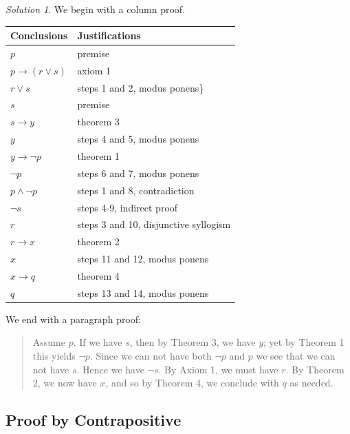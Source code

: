 \documentclass[
  letterpaper,
  10pt,
  reqno,
  twopage,
  openany]{book}
\theoremstyle{plain}
\theoremstyle{definition}
\theoremstyle{definition}
\theoremstyle{definition}
\theoremstyle{plain}
\theoremstyle{plain}
\theoremstyle{remark}
\newtheorem*{solution}{Solution}
\begin{document}
\begin{solution}

We begin with a column proof.

\begin{longtable}[]{@{}ll@{}}
\toprule()
Conclusions & Justifications \\
\midrule()
\endhead
\(p\) & premise \\
\(p\rightarrow (r\lor s)\) & axiom 1 \\
\(r\lor s\) & steps 1 and 2, modus ponens\} \\
\(s\) & premise \\
\(s\rightarrow y\) & theorem 3 \\
\(y\) & steps 4 and 5, modus ponens \\
\(y\rightarrow \neg p\) & theorem 1 \\
\(\neg p\) & steps 6 and 7, modus ponens \\
\(p\land \neg p\) & steps 1 and 8, contradiction \\
\(\neg s\) & steps 4-9, indirect proof \\
\(r\) & steps 3 and 10, disjunctive syllogism \\
\(r\rightarrow x\) & theorem 2 \\
\(x\) & steps 11 and 12, modus ponens \\
\(x\rightarrow q\) & theorem 4 \\
\(q\) & steps 13 and 14, modus ponens \\
\bottomrule()
\end{longtable}

We end with a paragraph proof:

\begin{quote}
Assume \(p\). If we have \(s\), then by Theorem 3, we have \(y\); yet by
Theorem 1 this yields \(\neg p\). Since we can not have both \(\neg p\)
and \(p\) we see that we can not have \(s\). Hence we have \(\neg s\).
By Axiom 1, we must have \(r\). By Theorem 2, we now have \(x\), and so
by Theorem 4, we conclude with \(q\) as needed.
\end{quote}

\end{solution}

\hypertarget{proof-by-contrapositive}{%
\subsection{Proof by Contrapositive}\label{proof-by-contrapositive}}
\end{document}
